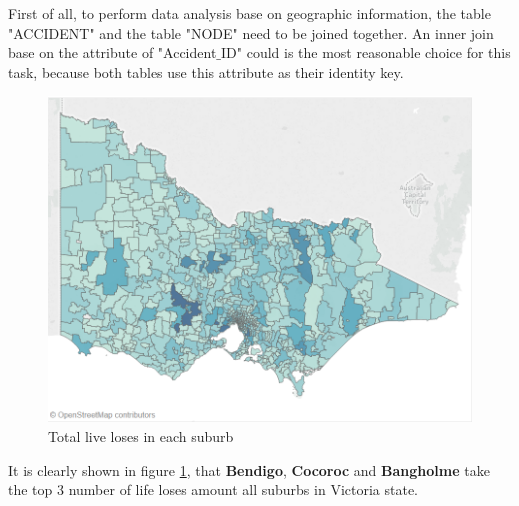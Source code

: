 \documentclass[10pt]{article}
\theoremstyle{definition}
\begin{document}
First of all, to perform data analysis base on geographic information, the table "ACCIDENT" and the table "NODE" need to be joined together. An inner join base on the attribute of "Accident$\_$ID" could is the most reasonable choice for this task, because both tables use this attribute as their identity key.\par

\begin{minipage}{\linewidth}
  	\centering
  \begin{minipage}{0.59\linewidth}
	\begin{figure}[H]
            \includegraphics[width=\linewidth]{images/mapTotal.png}
			\caption{Total live loses in each suburb}
			\label{fig:mapTotal}
    \end{figure}
  \end{minipage}
  \hspace{0.0\linewidth}
  \begin{minipage}{0.39\linewidth}
     It is clearly shown in figure \ref{fig:mapTotal}, that \textbf{Bendigo}, \textbf{Cocoroc} and \textbf{Bangholme} take the top 3 number of life loses amount all suburbs in Victoria state. 
     \end{minipage}\\
\end{minipage}\\
\vspace{8pt}
\end{document}
